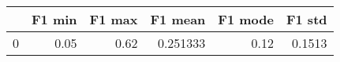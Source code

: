 \begin{tabular}{lrrrrr}
\toprule
{} &  F1 min &  F1 max &   F1 mean &  F1 mode &  F1 std \\
\midrule
0 &    0.05 &    0.62 &  0.251333 &     0.12 &  0.1513 \\
\bottomrule
\end{tabular}
